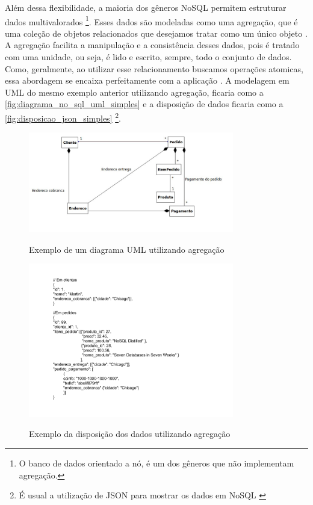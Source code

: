 Além dessa flexibilidade, a maioria dos gêneros NoSQL permitem estruturar dados multivalorados \footnote{O banco de dados orientado a nó, é um dos gêneros que não implementam agregação.}. Esses dados são modeladas como uma agregação, que é uma coleção de objetos relacionados que desejamos tratar como um único objeto \cite{domain-driven}. A agregação facilita a manipulação e a consistência desses dados, pois é tratado com uma unidade, ou seja, é lido e escrito, sempre, todo o conjunto de dados. Como, geralmente, ao utilizar esse relacionamento buscamos operações atomicas, essa abordagem se encaixa perfeitamente com a aplicação \cite{NoSQL}. A modelagem em \ac{UML} do mesmo exemplo anterior utilizando agregação, ficaria como a \autoref{fig:diagrama_no_sql_uml_simples} e a disposição de dados ficaria como a \autoref{fig:disposicao_json_simples} \footnote{É usual a utilização de JSON para mostrar os dados em NoSQL \cite{NoSQL}}.

\begin{figure}[!htb]
    \centering
    \caption{Exemplo de um diagrama \ac{UML} utilizando agregação}
    \includegraphics[width=0.8\textwidth]{./04-figuras/diagrama_no_sql_uml_simples.jpg}
    \label{fig:diagrama_sql_uml}
\end{figure}
\begin{figure}[!htb]
    \centering
    \caption{Exemplo da disposição dos dados utilizando agregação}
    \includegraphics[width=0.8\textwidth]{./04-figuras/disposicao_json_simples.png}
    \label{fig:disposicao_tabela}
\end{figure}



